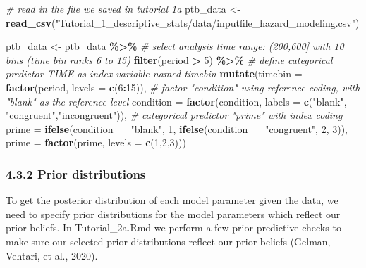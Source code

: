 \documentclass[
  man, donotrepeattitle,floatsintext]{apa6}
\newenvironment{Shaded}{\begin{snugshade}}{\end{snugshade}}
\newcommand{\AttributeTok}[1]{\textcolor[rgb]{0.13,0.29,0.53}{#1}}
\newcommand{\CommentTok}[1]{\textcolor[rgb]{0.56,0.35,0.01}{\textit{#1}}}
\newcommand{\DecValTok}[1]{\textcolor[rgb]{0.00,0.00,0.81}{#1}}
\newcommand{\FunctionTok}[1]{\textcolor[rgb]{0.13,0.29,0.53}{\textbf{#1}}}
\newcommand{\NormalTok}[1]{#1}
\newcommand{\OtherTok}[1]{\textcolor[rgb]{0.56,0.35,0.01}{#1}}
\newcommand{\SpecialCharTok}[1]{\textcolor[rgb]{0.81,0.36,0.00}{\textbf{#1}}}
\newcommand{\StringTok}[1]{\textcolor[rgb]{0.31,0.60,0.02}{#1}}
\begin{document}
\footnotesize

\begin{Shaded}
\begin{Highlighting}[]
\CommentTok{\# read in the file we saved in tutorial 1a}
\NormalTok{ptb\_data }\OtherTok{\textless{}{-}} \FunctionTok{read\_csv}\NormalTok{(}\StringTok{"Tutorial\_1\_descriptive\_stats/data/inputfile\_hazard\_modeling.csv"}\NormalTok{)}

\NormalTok{ptb\_data }\OtherTok{\textless{}{-}}\NormalTok{ ptb\_data }\SpecialCharTok{\%\textgreater{}\%} 
\CommentTok{\# select analysis time range: (200,600] with 10 bins (time bin ranks 6 to 15)}
\FunctionTok{filter}\NormalTok{(period }\SpecialCharTok{\textgreater{}} \DecValTok{5}\NormalTok{) }\SpecialCharTok{\%\textgreater{}\%}
       \CommentTok{\# define categorical predictor TIME as index variable named timebin}
\FunctionTok{mutate}\NormalTok{(}\AttributeTok{timebin =} \FunctionTok{factor}\NormalTok{(period, }\AttributeTok{levels =} \FunctionTok{c}\NormalTok{(}\DecValTok{6}\SpecialCharTok{:}\DecValTok{15}\NormalTok{)),}
       \CommentTok{\# factor "condition" using reference coding, with "blank" as the reference level}
       \AttributeTok{condition =} \FunctionTok{factor}\NormalTok{(condition, }\AttributeTok{labels =} \FunctionTok{c}\NormalTok{(}\StringTok{"blank"}\NormalTok{, }\StringTok{"congruent"}\NormalTok{,}\StringTok{"incongruent"}\NormalTok{)),}
       \CommentTok{\# categorical predictor "prime" with index coding}
       \AttributeTok{prime =} \FunctionTok{ifelse}\NormalTok{(condition}\SpecialCharTok{==}\StringTok{"blank"}\NormalTok{, }\DecValTok{1}\NormalTok{, }\FunctionTok{ifelse}\NormalTok{(condition}\SpecialCharTok{==}\StringTok{"congruent"}\NormalTok{, }\DecValTok{2}\NormalTok{, }\DecValTok{3}\NormalTok{)),}
       \AttributeTok{prime =} \FunctionTok{factor}\NormalTok{(prime, }\AttributeTok{levels =} \FunctionTok{c}\NormalTok{(}\DecValTok{1}\NormalTok{,}\DecValTok{2}\NormalTok{,}\DecValTok{3}\NormalTok{)))}
\end{Highlighting}
\end{Shaded}

\normalsize

\subsubsection{4.3.2 Prior distributions}\label{prior-distributions}

To get the posterior distribution of each model parameter given the data, we need to specify prior distributions for the model parameters which reflect our prior beliefs.
In Tutorial\_2a.Rmd we perform a few prior predictive checks to make sure our selected prior distributions reflect our prior beliefs (Gelman, Vehtari, et al., 2020).
\end{document}
